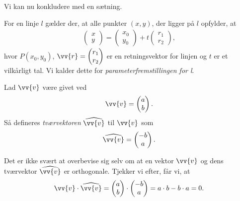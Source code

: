 \newpage

Vi kan nu konkludere med en sætning.
\begin{setn}
For en linje $l$ gælder der, at alle punkter $(x,y)$, der ligger på $l$ opfylder, at
\begin{align*}
\begin{pmatrix}
x \\ y
\end{pmatrix}
=
\begin{pmatrix}
x_0 \\ y_0
\end{pmatrix} 
+
t
\begin{pmatrix}
r_1 \\ r_2
\end{pmatrix},
\end{align*} 
hvor $P(x_0,y_0)$, $\vv{r} = \begin{pmatrix}
r_1 \\ r_2
\end{pmatrix}$
er en retningsvektor for linjen og $t$ er et vilkårligt tal. Vi kalder dette for \textit{parameterfremstillingen for l}.
\end{setn}
\begin{defn}[Tværvektor]
	Lad $\vv{v}$ være givet ved
	\begin{align*}
		\vv{v} = 
		\begin{pmatrix}
			a \\ b
		\end{pmatrix}.
	\end{align*}
	Så defineres \textit{tværvektoren} $\widehat{\vv{v}}$ til $\vv{v}$ som 
	\begin{align*}
		\widehat{\vv{v}} = 
		\begin{pmatrix}
			-b \\ a
		\end{pmatrix}.
	\end{align*}
\end{defn}
Det er ikke svært at overbevise sig selv om at en vektor $\vv{v}$ og dens tværvektor $\widehat{\vv{v}}$ er orthogonale. Tjekker vi efter, får vi, at 
\begin{align*}
	\vv{v} \cdot \widehat{\vv{v}} = 
	\begin{pmatrix}
		a \\ b
	\end{pmatrix} \cdot
	\begin{pmatrix}
		-b \\ a
	\end{pmatrix} = 
	a\cdot b - b\cdot a = 0. 
\end{align*}
